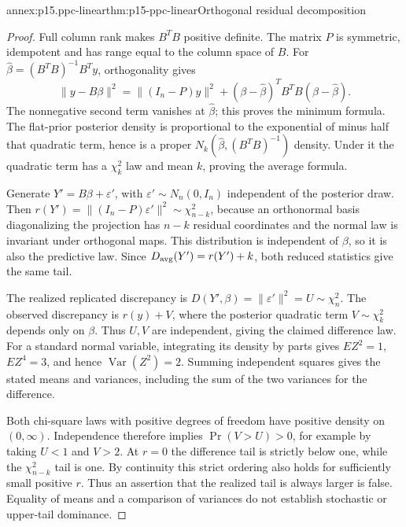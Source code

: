 \begin{annexitem}{annex:p15.ppc-linear}{thm:p15-ppc-linear}{Orthogonal residual decomposition}
\begin{proof}
Full column rank makes \(B^TB\) positive definite. The matrix \(P\)
is symmetric, idempotent and has range equal to the column space of
\(B\). For \(\widehat\beta=(B^TB)^{-1}B^Ty\), orthogonality gives
\[
 \|y-B\beta\|^2
 =\|(I_n-P)y\|^2
  +(\beta-\widehat\beta)^TB^TB(\beta-\widehat\beta).
\]
The nonnegative second term vanishes at \(\widehat\beta\); this proves
the minimum formula. The flat-prior posterior density is proportional to
the exponential of minus half that quadratic term, hence is a proper
\(N_k(\widehat\beta,(B^TB)^{-1})\) density. Under it the quadratic
term has a \(\chi^2_k\) law and mean \(k\), proving the average formula.

Generate \(Y'=B\beta+\varepsilon'\), with
\(\varepsilon'\sim N_n(0,I_n)\) independent of the posterior draw.
Then \(r(Y')=\|(I_n-P)\varepsilon'\|^2\sim\chi^2_{n-k}\),
because an orthonormal basis diagonalizing the projection has \(n-k\)
residual coordinates and the normal law is invariant under orthogonal maps.
This distribution is independent of \(\beta\), so it is also the
predictive law. Since \(D_{\rm avg}(Y')=r(Y')+k\), both reduced
statistics give the same tail.

The realized replicated discrepancy is
\(D(Y',\beta)=\|\varepsilon'\|^2=U\sim\chi^2_n\).
The observed discrepancy is \(r(y)+V\), where the posterior quadratic
term \(V\sim\chi^2_k\) depends only on \(\beta\). Thus \(U,V\)
are independent, giving the claimed difference law.
For a standard normal variable, integrating its density by parts gives
\(E Z^2=1\), \(E Z^4=3\), and hence
\(\operatorname{Var}(Z^2)=2\). Summing independent squares gives the
stated means and variances, including the sum of the two variances for
the difference.

Both chi-square laws with positive degrees of freedom have positive
density on \((0,\infty)\). Independence therefore implies
\(\Pr(V>U)>0\), for example by taking \(U<1\) and \(V>2\).
At \(r=0\) the difference tail is strictly below one, while the
\(\chi^2_{n-k}\) tail is one. By continuity this strict ordering also
holds for sufficiently small positive \(r\). Thus an assertion that the
realized tail is always larger is false. Equality of means and a comparison
of variances do not establish stochastic or upper-tail dominance.
\end{proof}
\end{annexitem}

